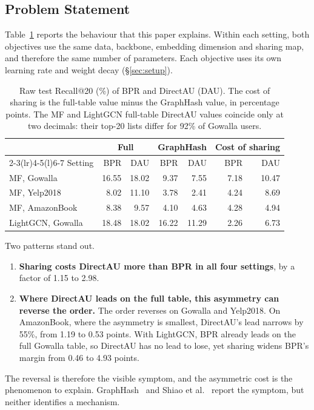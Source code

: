 \subsection{Problem Statement}\label{sec:prelim-problem}

Table~\ref{tab:problem} reports the behaviour that this paper explains. Within each setting, both objectives use the same data, backbone, embedding dimension and sharing map, and therefore the same number of parameters. Each objective uses its own learning rate and weight decay (\S\ref{sec:setup}).

\begin{table}[t]
  \caption{Raw test Recall@20 (\%) of BPR and DirectAU (DAU). The cost of sharing is the full-table value minus the GraphHash value, in percentage points. The MF and LightGCN full-table DirectAU values coincide only at two decimals: their top-20 lists differ for 92\% of Gowalla users.}
  \label{tab:problem}
  \small
  \setlength{\tabcolsep}{4pt}
  \begin{tabular}{@{}lrrrrrr@{}}
    \toprule
    & \multicolumn{2}{c}{Full} & \multicolumn{2}{c}{GraphHash} & \multicolumn{2}{c}{Cost of sharing}\\
    \cmidrule(lr){2-3}\cmidrule(lr){4-5}\cmidrule(l){6-7}
    Setting & BPR & DAU & BPR & DAU & BPR & DAU\\
    \midrule
    MF, Gowalla       & 16.55 & 18.02 & 9.37  & 7.55  & 7.18 & 10.47\\
    MF, Yelp2018      &  8.02 & 11.10 & 3.78  & 2.41  & 4.24 &  8.69\\
    MF, AmazonBook    &  8.38 &  9.57 & 4.10  & 4.63  & 4.28 &  4.94\\
    \midrule
    LightGCN, Gowalla & 18.48 & 18.02 & 16.22 & 11.29 & 2.26 &  6.73\\
    \bottomrule
  \end{tabular}
\end{table}

Two patterns stand out.
\begin{enumerate}
\item \textbf{Sharing costs DirectAU more than BPR in all four settings}, by a factor of 1.15 to 2.98.
\item \textbf{Where DirectAU leads on the full table, this asymmetry can reverse the order.} The order reverses on Gowalla and Yelp2018. On AmazonBook, where the asymmetry is smallest, DirectAU's lead narrows by 55\%, from 1.19 to 0.53 points. With LightGCN, BPR already leads on the full Gowalla table, so DirectAU has no lead to lose, yet sharing widens BPR's margin from 0.46 to 4.93 points.
\end{enumerate}
The reversal is therefore the visible symptom, and the asymmetric cost is the phenomenon to explain. GraphHash~\cite{wu2025graphhash} and Shiao et al.~\cite{shiao2025oov} report the symptom, but neither identifies a mechanism.

